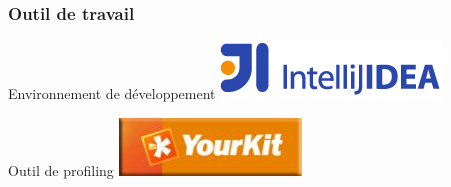 \begin{frame}\frametitle{Outil de travail}
\begin{centering}
	\begin{minipage}[c]{.6\linewidth}
		\begin{beamerboxesrounded}[shadow=true,center]{Environnement de développement}
			\centering
			\includegraphics[width=.4\linewidth]{../image/intellijLogo.png}
		\end{beamerboxesrounded}
	\end{minipage}
	\vfill
	\begin{minipage}[c]{.6\linewidth}
		\begin{beamerboxesrounded}[shadow=true,center]{Outil de profiling}
			\centering
			\includegraphics[width=.3\linewidth]{../image/yourkit.jpg}
		\end{beamerboxesrounded}
	\end{minipage}
	\vfill

\end{centering}
\end{frame}
